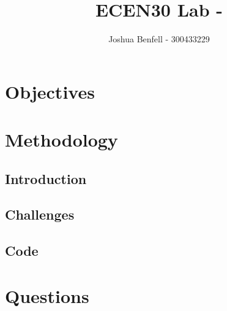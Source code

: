 \documentclass[a4paper, 12pt]{article}
\title{ECEN30 Lab  - }
\author{Joshua Benfell - 300433229}
\begin{document}
	\maketitle
	
	\section{Objectives}
	\section{Methodology}
		\subsection{Introduction}
			
		\subsection{Challenges}

		\subsection{Code}

	\section{Questions}



\end{document}
